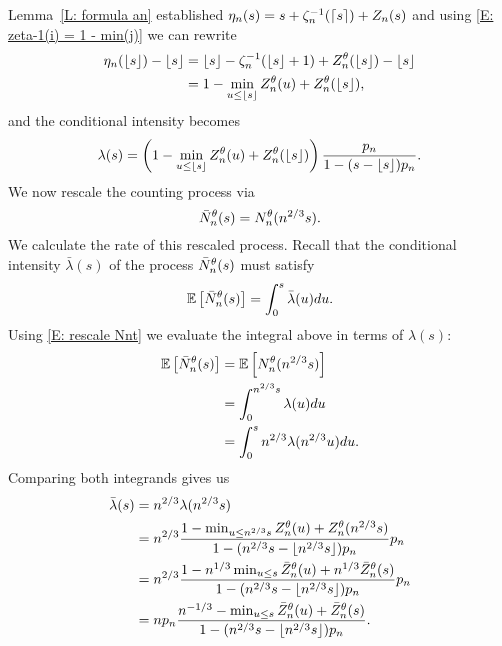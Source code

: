 Lemma~\ref{L: formula an} established $\eta_n(s) = s + \zeta^{-1}_n(\lceil s\rceil) + Z_n(s)$ 
and using \eqref{E: zeta-1(i) = 1 - min(j)} we can rewrite
\begin{equation*}
\begin{aligned}
\eta_n(\lfloor s\rfloor) - \lfloor s\rfloor 
&= \lfloor s\rfloor - \zeta^{-1}_n(\lfloor s\rfloor+1) + Z_n^{\theta}(\lfloor s\rfloor) - \lfloor s\rfloor \\
&= 1 - \min_{u \leq \lfloor s\rfloor} Z_n^{\theta}(u) + Z_n^{\theta}(\lfloor s\rfloor),
\end{aligned}
\end{equation*}
and the conditional intensity becomes
\begin{equation*} \label{E: rate Nnt 2}
\lambda(s) = \left(1 - \min_{u \leq \lfloor s\rfloor} Z_n^{\theta}(u) + Z_n^{\theta}(\lfloor s\rfloor) \right) \frac{p_n}{1-(s-\lfloor s\rfloor)p_n}.
\end{equation*}
We now rescale the counting process via
\begin{equation} \label{E: rescale Nnt}
\bar{N}_n^{\theta}(s) = N_n^{\theta}(n^{2 / 3}s).
\end{equation}
We calculate the rate of this rescaled process.
Recall that the conditional intensity $\bar{\lambda}(s)$ of the process $\bar{N}_n^{\theta}(s)$ must satisfy
\begin{equation*}
\mathbb{E} \left[ \bar{N}_n^{\theta}(s) \right] = \int_{0}^{s} \bar{\lambda}(u) du.
\end{equation*}
Using \eqref{E: rescale Nnt} we evaluate the integral above in terms of $\lambda(s)$:
\begin{equation*}
\begin{aligned}
\mathbb{E} \left[ \bar{N}_n^{\theta}(s) \right]
&= \mathbb{E} \left[ N_n^{\theta}(n^{2 / 3}s) \right] \\
&= \int_{0}^{n^{2 / 3}s} \lambda(u) du \\
&= \int_{0}^{s} n^{2 / 3} \lambda(n^{2 / 3}u) du.
\end{aligned}
\end{equation*}
Comparing both integrands gives us
\begin{equation} \label{E: conditional intensity final}
\begin{aligned}
\bar{\lambda}(s)
&= n^{2 / 3} \lambda(n^{2 / 3}s) \\
&= n^{2 / 3} \frac{1 - \min_{u \leq n^{2 / 3}s} Z_n^{\theta}(u) + Z_n^{\theta}(n^{2 / 3}s)}{1 - (n^{2 / 3}s - \lfloor n^{2 / 3}s\rfloor)p_n} p_n \\
&= n^{2 / 3} \frac{1 - n^{1 / 3} \min_{u \leq s} \bar{Z}^{\theta}_n(u) + n^{1 / 3}\bar{Z}^{\theta}_n(s)}{1 - (n^{2 / 3}s - \lfloor n^{2 / 3}s\rfloor)p_n} p_n \\
&= n p_n \frac{n^{-1 / 3} - \min_{u \leq s} \bar{Z}^{\theta}_n(u) + \bar{Z}^{\theta}_n(s)}{1 - (n^{2 / 3}s - \lfloor n^{2 / 3}s\rfloor)p_n}.
\end{aligned}
\end{equation}

